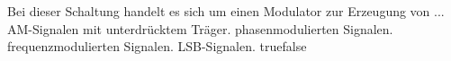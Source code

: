     {Bei dieser Schaltung handelt es sich um einen Modulator zur Erzeugung von ...}
    {AM-Signalen mit unterdrücktem Träger.}
    {phasenmodulierten Signalen.}
    {frequenzmodulierten Signalen.}
    {LSB-Signalen.}
    {true}{false}